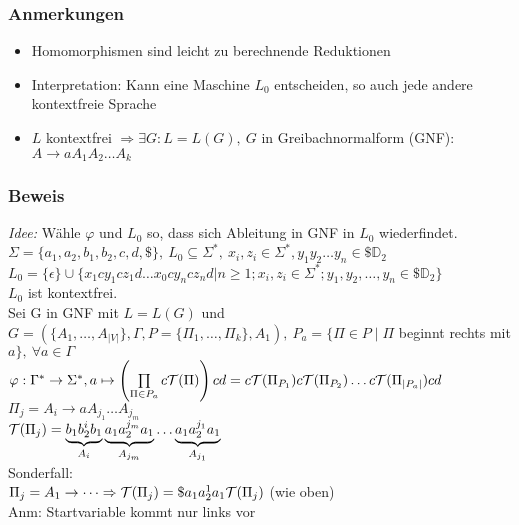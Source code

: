         \subsubsection{Anmerkungen}
            \begin{itemize}
                \item Homomorphismen sind leicht zu berechnende Reduktionen
                \item Interpretation: Kann eine Maschine $L_0$ entscheiden, so auch jede andere kontextfreie Sprache
                \item $L$ kontextfrei $\Rightarrow\exists G:L=L(G),\ G$ in Greibachnormalform (GNF):
                \subitem $A\rightarrow aA_1A_2\dots A_k$
            \end{itemize}
        \subsubsection{Beweis}
            \emph{Idee:} Wähle $\varphi$ und $L_0$ so, dass sich Ableitung in GNF in $L_0$ wiederfindet.\\[0.2cm]
            $\Sigma=\{a_1,a_2,b_1,b_2,c,d,\$\},\ L_0\subseteq \Sigma^*,\ x_i,z_i\in\Sigma^*, y_1y_2\dots y_n\in\$\mathds{D}_2$\\
			$L_0 = \{\epsilon\}\cup\{x_1cy_1cz_1d\dots x_0cy_ncz_nd| n\geq 1;x_i,z_i \in \Sigma^*; y_1,y_2,\dots,y_n\in \$\mathds{D}_2\}$\\
            $L_0$ ist kontextfrei.\\[0,2cm]
            Sei G in GNF mit $L=L(G)$ und $G=\left(\{A_1,\dots,A_{|V|}\},\Gamma,P=\{\Pi_1,\dots,\Pi_k\},A_1\right),\ P_a=\{\Pi\in P\mid \Pi$ beginnt rechts mit $a\},\ \forall a\in\Gamma$\\
            $\varphi:\Gamma^*\rightarrow\Sigma^*, a\mapsto \left(\prod\limits_{\Pi\in P_a}c\mathcal{T}(\Pi)\right)cd=c\mathcal{T}(\Pi_{P_1})c\mathcal{T}(\Pi_{P_2})\dots c\mathcal{T}(\Pi_{|P_a|})cd$\\
            $\Pi_j=A_i\rightarrow aA_{j_1}\dots A_{j_m}$\\
            $\mathcal{T}(\Pi_j)=\underbrace{b_1b_2^ib_1}_{A_i}\underbrace{a_1a_2^{j_m}a_1}_{A_{j_m}}\dots \underbrace{a_1a_2^{j_1}a_1}_{A_{j_1}}$\\
            Sonderfall:\\
            $\Pi_j=A_1\rightarrow\dots \Rightarrow \mathcal{T}(\Pi_j)=\$a_1a_2^1a_1\mathcal{T}(\Pi_j)$ (wie oben)\\
            Anm: Startvariable kommt nur links vor
